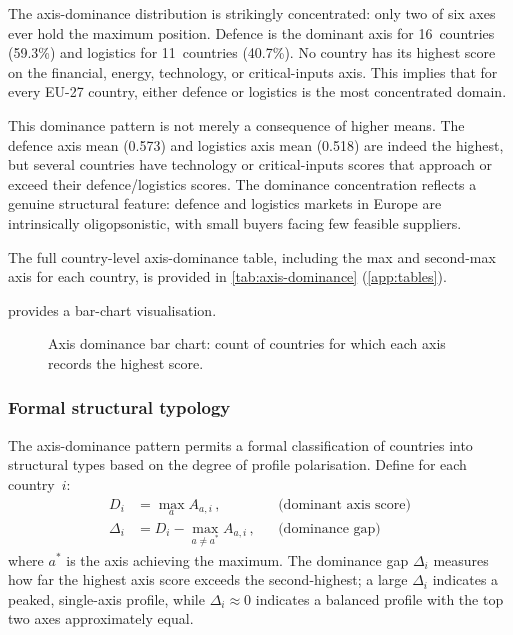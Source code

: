 The axis-dominance distribution is strikingly concentrated: only two
of six axes ever hold the maximum position.  Defence is the dominant
axis for 16~countries (59.3\%) and logistics for 11~countries (40.7\%).
No country has its highest score on the financial, energy, technology,
or critical-inputs axis.  This implies that for every EU-27 country,
either defence or logistics is the most concentrated domain.

This dominance pattern is not merely a consequence of higher means.
The defence axis mean (0.573) and logistics axis mean (0.518) are
indeed the highest, but several countries have technology or
critical-inputs scores that approach or exceed their defence/logistics
scores.  The dominance concentration reflects a genuine structural
feature: defence and logistics markets in Europe are intrinsically
oligopsonistic, with small buyers facing few feasible suppliers.

The full country-level axis-dominance table, including the max and
second-max axis for each country, is provided in \cref{tab:axis-dominance}
(\cref{app:tables}).

 provides a bar-chart visualisation.

\begin{figure}[htbp]
\centering

\caption{Axis dominance bar chart: count of countries for which each
  axis records the highest score.}
\label{fig:axis-dominance-bar}
\end{figure}

\subsubsection{Formal structural typology}\label{sec:structural-typology}

The axis-dominance pattern permits a formal classification of countries
into structural types based on the degree of profile polarisation.
Define for each country~$i$:
\begin{align}
  D_i &= \max_{a} A_{a,i}\,,
    & &\text{(dominant axis score)} \label{eq:dominance-score} \\
  \Delta_i &= D_i - \max_{a \neq a^*} A_{a,i}\,,
    & &\text{(dominance gap)} \label{eq:dominance-gap}
\end{align}
where $a^*$ is the axis achieving the maximum.  The dominance gap
$\Delta_i$ measures how far the highest axis score exceeds the
second-highest; a large $\Delta_i$ indicates a peaked, single-axis
profile, while $\Delta_i \approx 0$ indicates a balanced profile
with the top two axes approximately equal.

